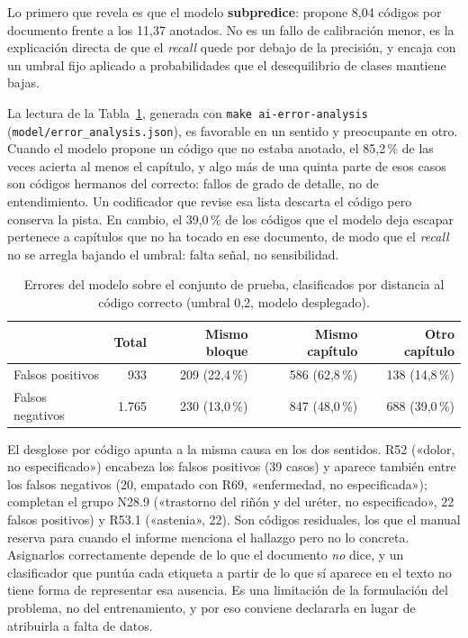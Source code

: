 Lo primero que revela es que el modelo \textbf{subpredice}: propone 8,04 códigos por documento frente a los 11,37 anotados. No es un fallo de calibración menor, es la explicación directa de que el \emph{recall} quede por debajo de la precisión, y encaja con un umbral fijo aplicado a probabilidades que el desequilibrio de clases mantiene bajas.

La lectura de la Tabla~\ref{tab:analisis-error}, generada con \texttt{make ai-error-analysis} (\texttt{model/\allowbreak{}error\_analysis.json}), es favorable en un sentido y preocupante en otro. Cuando el modelo propone un código que no estaba anotado, el 85,2\,\% de las veces acierta al menos el capítulo, y algo más de una quinta parte de esos casos son códigos hermanos del correcto: fallos de grado de detalle, no de entendimiento. Un codificador que revise esa lista descarta el código pero conserva la pista. En cambio, el 39,0\,\% de los códigos que el modelo deja escapar pertenece a capítulos que no ha tocado en ese documento, de modo que el \emph{recall} no se arregla bajando el umbral: falta señal, no sensibilidad.

\begin{table}[h]
\centering
\small
\caption{Errores del modelo sobre el conjunto de prueba, clasificados por distancia al código correcto (umbral 0,2, modelo desplegado).}
\label{tab:analisis-error}
\begin{tabular}{lrrrr}
\hline
 & \textbf{Total} & \textbf{Mismo bloque} & \textbf{Mismo capítulo} & \textbf{Otro capítulo} \\
\hline
Falsos positivos & 933 & 209 (22,4\,\%) & 586 (62,8\,\%) & 138 (14,8\,\%) \\
Falsos negativos & 1.765 & 230 (13,0\,\%) & 847 (48,0\,\%) & 688 (39,0\,\%) \\
\hline
\end{tabular}
\end{table}

El desglose por código apunta a la misma causa en los dos sentidos. R52 («dolor, no especificado») encabeza los falsos positivos (39 casos) y aparece también entre los falsos negativos (20, empatado con R69, «enfermedad, no especificada»); completan el grupo N28.9 («trastorno del riñón y del uréter, no especificado», 22 falsos positivos) y R53.1 («astenia», 22). Son códigos residuales, los que el manual reserva para cuando el informe menciona el hallazgo pero no lo concreta. Asignarlos correctamente depende de lo que el documento \emph{no} dice, y un clasificador que puntúa cada etiqueta a partir de lo que sí aparece en el texto no tiene forma de representar esa ausencia. Es una limitación de la formulación del problema, no del entrenamiento, y por eso conviene declararla en lugar de atribuirla a falta de datos.

